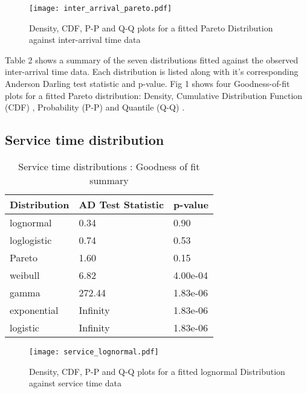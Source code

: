 \documentclass[5p]{elsarticle}
\begin{document}
\begin{figure*}[]
\begin{center}
\texttt{[image: inter\_arrival\_pareto.pdf]} 
\caption{Density, CDF, P-P and Q-Q plots for a fitted Pareto Distribution against inter-arrival time data}
\end{center}
\label{fig:outagedistribution}
\end{figure*}

Table 2 shows a summary of the seven distributions fitted against the observed inter-arrival time data. Each distribution is listed along with it's corresponding Anderson Darling test statistic and p-value. Fig 1 shows four Goodness-of-fit plots for a fitted Pareto distribution: Density, Cumulative Distribution Function (CDF) , Probability (P-P) \cite{gibbons2011nonparametric}  and Quantile (Q-Q) \cite{wilk1968probability}.  

\subsection{Service time distribution}

\begin {table}
\caption {Service time distributions :  Goodness of fit summary} 
\begin{center}
\begin{tabular}{p{2.1cm} |  p{3.1cm} | p{1.3cm}} \hline \bf{Distribution} & \bf{AD Test Statistic} & \bf{p-value}
\\ \hline lognormal & 0.34 & 0.90
\\ loglogistic & 0.74 & 0.53
\\ Pareto & 1.60 & 0.15 
\\ weibull  & 6.82 & 4.00e-04 
\\ gamma & 272.44 & 1.83e-06	
\\ exponential & Infinity & 1.83e-06
\\ logistic & Infinity  & 1.83e-06	
\\ \hline
\end{tabular}
\end{center}
\end{table}

\begin{figure*}[]
\begin{center}
\texttt{[image: service\_lognormal.pdf]} 
\caption{Density, CDF, P-P and Q-Q plots for a fitted lognormal Distribution against service time data}
\end{center}
\label{fig:outagedistribution}
\end{figure*}
\end{document}
